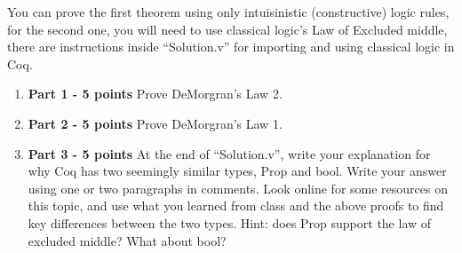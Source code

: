 \documentclass{article}
\begin{document}
You can prove the first theorem using only intuisinistic (constructive) logic rules, for the second one, you will need to use classical logic's Law of Excluded middle, there are
instructions inside ``Solution.v'' for importing and using classical logic in Coq.

\begin{enumerate}
    \item \textbf{Part 1 - 5 points} Prove DeMorgran's Law 2.
    \item \textbf{Part 2 - 5 points} Prove DeMorgran's Law 1.
    \item \textbf{Part 3 - 5 points} At the end of ``Solution.v'', write your explanation for why Coq has two seemingly similar types, Prop and bool. Write your answer using one or two paragraphs in comments.
    Look online for some resources on this topic, and use what you learned from class and the above proofs to find key differences between the two types. Hint: does Prop support the law of excluded middle? What about bool?
\end{enumerate}
\end{document}
